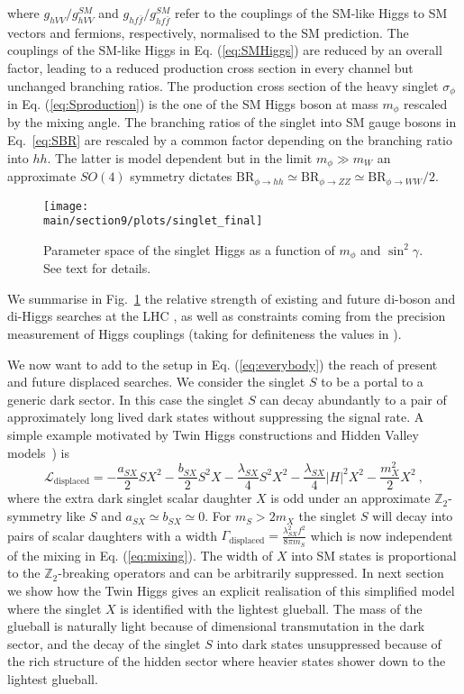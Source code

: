 where $g_{hVV}/g_{hVV}^{SM}$ and $g_{hf\bar f}/g_{hf\bar f}^{SM}$ refer to the couplings of the SM-like Higgs to SM vectors and fermions, respectively, normalised to the SM prediction. The couplings of the SM-like Higgs in Eq. (\ref{eq:SMHiggs}) are reduced by an overall factor, leading to a reduced production cross section in every channel but unchanged branching ratios. The production cross section of the heavy singlet $\sigma_\phi$ in Eq. (\ref{eq:Sproduction}) is the one of the SM Higgs boson at mass $m_\phi$ rescaled by the mixing angle.  The branching ratios of the singlet into SM gauge bosons in Eq.~\eqref{eq:SBR} are rescaled by a common factor depending on the branching ratio into $hh$. The latter is model dependent but in the limit $m_\phi\gg m_W$ an approximate $SO(4)$ symmetry dictates $\text{BR}_{\phi\to hh }\simeq \text{BR}_{\phi\to ZZ}\simeq \text{BR}_{\phi\to WW} /2$.

\begin{figure}[t]
\texttt{[image: \\main/section9/plots/singlet\_final]}
\centering
\caption{Parameter space of the singlet Higgs as a function of $m_\phi$ and $\sin^2 \gamma$. See text for details.
\label{fig:singlet}
}
\end{figure}
We summarise in Fig.~\ref{fig:singlet} the relative strength of existing and future di-boson and di-Higgs searches at the LHC \cite{Sirunyan:2018qlb,Aaboud:2018knk,Sirunyan:2017isc,ATLAS:2017spa}, as well as constraints coming from the precision measurement of Higgs couplings (taking for definiteness the values in \cite{Dawson:2013bba}). 

We now want to add to the setup in Eq. (\ref{eq:everybody}) the reach of present and future displaced searches.  We consider the singlet $S$ to be a portal to a generic dark sector. In this case the singlet $S$ can decay abundantly to a pair of approximately long lived  dark states without suppressing the signal rate. A simple example motivated by Twin Higgs constructions \cite{Craig:2015pha} and Hidden Valley models~\cite{Strassler:2006ri,Han:2007ae}) is 
\begin{equation}
\mathcal{L}_{\text{displaced}}=-\frac{a_{SX}}{2} S X^2-\frac{b_{SX}}{2} S^2 X-\frac{\lambda_{SX}}{4} S^2 X^2-\frac{\lambda_{SX}}{4} \vert H\vert^2 X^2-\frac{m_X^2}{2} X^2\ ,
\end{equation} 
where  the extra dark singlet scalar daughter $X$ is odd under an approximate $\mathbb{Z}_2$-symmetry like $S$ and $a_{SX}\simeq b_{SX}\simeq0$. For $m_S>2 m_X$ the singlet $S$ will decay into pairs of scalar daughters with a width $\Gamma_{\text{displaced}}=\frac{\lambda_{SX}^2 f^2}{8\pi m_S}$ which is now independent of the mixing in Eq. (\ref{eq:mixing}). The width of $X$ into SM states is proportional to the $\mathbb{Z}_2$-breaking operators and can be arbitrarily suppressed. In next section we show how the Twin Higgs gives an explicit realisation of this simplified model where the singlet $X$ is identified with the lightest glueball. The mass of the glueball is naturally light because of dimensional transmutation in the dark sector, and the decay of the singlet $S$ into dark states unsuppressed because of the rich structure of the hidden sector where heavier states shower down to the lightest glueball. 

